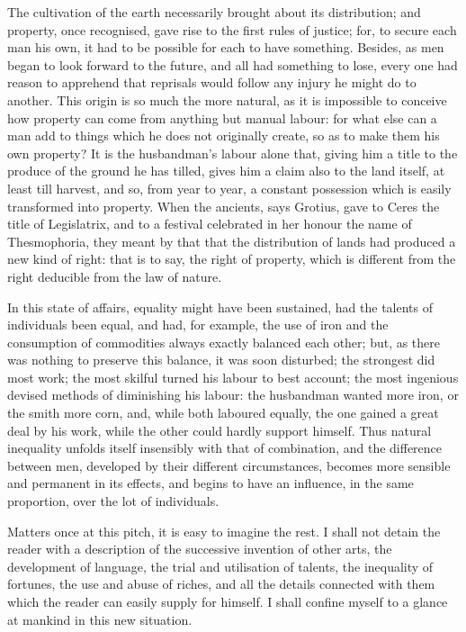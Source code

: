 \documentclass[12pt]{report}
\begin{document}
The cultivation of the earth necessarily brought about its distribution; and property, once recognised, gave rise to the first rules of justice; for, to secure each man his own, it had to be possible for each to have something. Besides, as men began to look forward to the future, and all had something to lose, every one had reason to apprehend that reprisals would follow any injury he might do to another. This origin is so much the more natural, as it is impossible to conceive how property can come from anything but manual labour: for what else can a man add to things which he does not originally create, so as to make them his own property? It is the husbandman's labour alone that, giving him a title to the produce of the ground he has tilled, gives him a claim also to the land itself, at least till harvest, and so, from year to year, a constant possession which is easily transformed into property. When the ancients, says Grotius, gave to Ceres the title of Legislatrix, and to a festival celebrated in her honour the name of Thesmophoria, they meant by that that the distribution of lands had produced a new kind of right: that is to say, the right of property, which is different from the right deducible from the law of nature.

In this state of affairs, equality might have been sustained, had the talents of individuals been equal, and had, for example, the use of iron and the consumption of commodities always exactly balanced each other; but, as there was nothing to preserve this balance, it was soon disturbed; the strongest did most work; the most skilful turned his labour to best account; the most ingenious devised methods of diminishing his labour: the husbandman wanted more iron, or the smith more corn, and, while both laboured equally, the one gained a great deal by his work, while the other could hardly support himself. Thus natural inequality unfolds itself insensibly with that of combination, and the difference between men, developed by their different circumstances, becomes more sensible and permanent in its effects, and begins to have an influence, in the same proportion, over the lot of individuals.

Matters once at this pitch, it is easy to imagine the rest. I shall not detain the reader with a description of the successive invention of other arts, the development of language, the trial and utilisation of talents, the inequality of fortunes, the use and abuse of riches, and all the details connected with them which the reader can easily supply for himself. I shall confine myself to a glance at mankind in this new situation.
\end{document}
